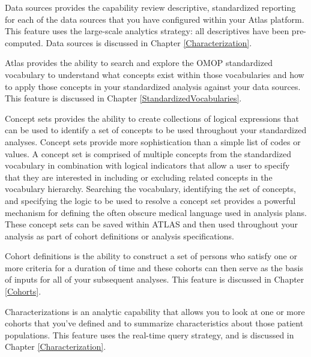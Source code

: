 \documentclass[11pt]{book}
\providecommand{\tightlist}{%
  \setlength{\itemsep}{0pt}\setlength{\parskip}{0pt}}
\theoremstyle{definition}
\theoremstyle{definition}
\theoremstyle{definition}
\theoremstyle{remark}
\begin{document}
\begin{description}
\tightlist
\item[Data Sources \index{ATLAS!Data Sources} \index{Achilles|see {ATLAS!data sources}}]
Data sources provides the capability review descriptive, standardized reporting for each of the data sources that you have configured within your Atlas platform. This feature uses the large-scale analytics strategy: all descriptives have been pre-computed. Data sources is discussed in Chapter \ref{Characterization}.
\item[Vocabulary Search \index{ATLAS!vocabulary search}]
Atlas provides the ability to search and explore the OMOP standardized vocabulary to understand what concepts exist within those vocabularies and how to apply those concepts in your standardized analysis against your data sources. This feature is discussed in Chapter \ref{StandardizedVocabularies}.
\item[Concept Sets \index{ATLAS!concept sets} \index{concept sets|see {ATLAS!concept sets}}]
Concept sets provides the ability to create collections of logical expressions that can be used to identify a set of concepts to be used throughout your standardized analyses. Concept sets provide more sophistication than a simple list of codes or values. A concept set is comprised of multiple concepts from the standardized vocabulary in combination with logical indicators that allow a user to specify that they are interested in including or excluding related concepts in the vocabulary hierarchy. Searching the vocabulary, identifying the set of concepts, and specifying the logic to be used to resolve a concept set provides a powerful mechanism for defining the often obscure medical language used in analysis plans. These concept sets can be saved within ATLAS and then used throughout your analysis as part of cohort definitions or analysis specifications.
\item[Cohort Definitions \index{ATLAS!cohort definitions}]
Cohort definitions is the ability to construct a set of persons who satisfy one or more criteria for a duration of time and these cohorts can then serve as the basis of inputs for all of your subsequent analyses. This feature is discussed in Chapter \ref{Cohorts}.
\item[Characterizations \index{ATLAS!cohort characterization}]
Characterizations is an analytic capability that allows you to look at one or more cohorts that you've defined and to summarize characteristics about those patient populations. This feature uses the real-time query strategy, and is discussed in Chapter \ref{Characterization}.

\end{description}
\end{document}
